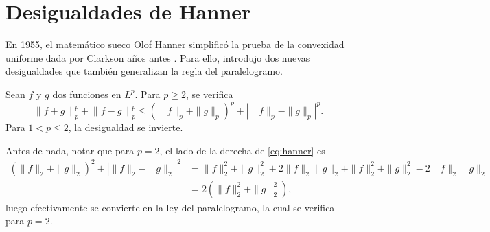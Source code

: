 \section{Desigualdades de Hanner}
En 1955, el matemático sueco Olof Hanner simplificó la prueba de la convexidad uniforme dada por Clarkson años antes \cite{hanner}. Para ello, introdujo dos nuevas desigualdades que también generalizan la regla del paralelogramo.

\begin{theorem}
    Sean $ f $ y $ g $ dos funciones en $L^p$. Para $ p \geq 2 $, se verifica
    \begin{equation} \label{eq:hanner}
        \left\| f+g \right\|_p^p + \left\| f-g \right\|_p^p \leq \left( \|f \|_p + \|g\|_p \right)^p + \left| \|f \|_p - \|g\|_p \right|^p.
    \end{equation}
    Para $ 1 < p \leq 2 $, la desigualdad se invierte.
\end{theorem}

Antes de nada, notar que para $ p = 2 $, el lado de la derecha de \eqref{eq:hanner} es
\begin{align}
    \left( \|f \|_2 + \|g\|_2 \right)^2 + \left| \|f \|_2 - \|g\|_2 \right|^2 &= \|f \|_2^2 + \|g\|_2^2 + 2 \|f \|_2 \|g\|_2 + \|f \|_2^2 + \|g\|_2^2 - 2 \|f \|_2 \|g\|_2 \\
    &= 2 \left(\|f \|_2^2 + \|g\|_2^2\right),
\end{align}
luego efectivamente se convierte en la ley del paralelogramo, la cual se verifica para $ p = 2 $.
